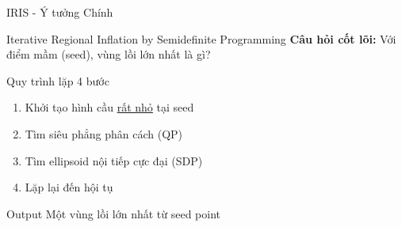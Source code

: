 \documentclass[aspectratio=169]{beamer}
\begin{document}
\begin{frame}{IRIS - Ý tưởng Chính}

    \begin{block}{Iterative Regional Inflation by Semidefinite Programming}
        \textbf{Câu hỏi cốt lõi:} Với điểm mầm (seed), vùng lồi lớn nhất là gì?
    \end{block}

    \begin{exampleblock}{Quy trình lặp 4 bước}
        \begin{enumerate}
            \item Khởi tạo hình cầu \underline{rất nhỏ} tại seed
            \item Tìm siêu phẳng phân cách (QP)
            \item Tìm ellipsoid nội tiếp cực đại (SDP)
            \item Lặp lại đến hội tụ
        \end{enumerate}
    \end{exampleblock}

    \begin{alertblock}{Output}
        Một vùng lồi lớn nhất từ seed point
    \end{alertblock}

\end{frame}
\end{document}
